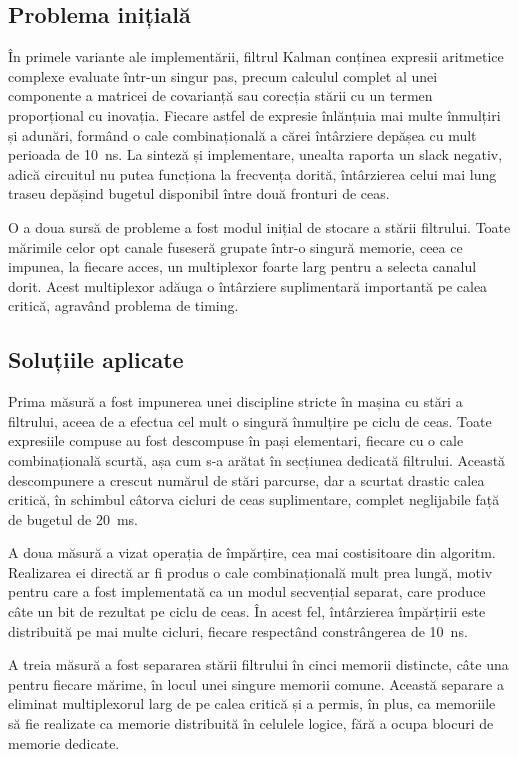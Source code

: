 \subsection{Problema inițială}

În primele variante ale implementării, filtrul Kalman conținea expresii aritmetice
complexe evaluate într-un singur pas, precum calculul complet al unei componente a
matricei de covarianță sau corecția stării cu un termen proporțional cu inovația.
Fiecare astfel de expresie înlănțuia mai multe înmulțiri și adunări, formând o cale
combinațională a cărei întârziere depășea cu mult perioada de 10~ns. La sinteză și
implementare, unealta raporta un slack negativ, adică circuitul nu putea funcționa la
frecvența dorită, întârzierea celui mai lung traseu depășind bugetul disponibil între
două fronturi de ceas.

O a doua sursă de probleme a fost modul inițial de stocare a stării filtrului. Toate
mărimile celor opt canale fuseseră grupate într-o singură memorie, ceea ce impunea, la
fiecare acces, un multiplexor foarte larg pentru a selecta canalul dorit. Acest
multiplexor adăuga o întârziere suplimentară importantă pe calea critică, agravând
problema de timing.

\subsection{Soluțiile aplicate}

Prima măsură a fost impunerea unei discipline stricte în mașina cu stări a filtrului,
aceea de a efectua cel mult o singură înmulțire pe ciclu de ceas. Toate expresiile
compuse au fost descompuse în pași elementari, fiecare cu o cale combinațională
scurtă, așa cum s-a arătat în secțiunea dedicată filtrului. Această descompunere a
crescut numărul de stări parcurse, dar a scurtat drastic calea critică, în schimbul
câtorva cicluri de ceas suplimentare, complet neglijabile față de bugetul de 20~ms.

A doua măsură a vizat operația de împărțire, cea mai costisitoare din algoritm.
Realizarea ei directă ar fi produs o cale combinațională mult prea lungă, motiv pentru
care a fost implementată ca un modul secvențial separat, care produce câte un bit de
rezultat pe ciclu de ceas. În acest fel, întârzierea împărțirii este distribuită pe
mai multe cicluri, fiecare respectând constrângerea de 10~ns.

A treia măsură a fost separarea stării filtrului în cinci memorii distincte, câte una
pentru fiecare mărime, în locul unei singure memorii comune. Această separare a
eliminat multiplexorul larg de pe calea critică și a permis, în plus, ca memoriile să
fie realizate ca memorie distribuită în celulele logice, fără a ocupa blocuri de
memorie dedicate.

